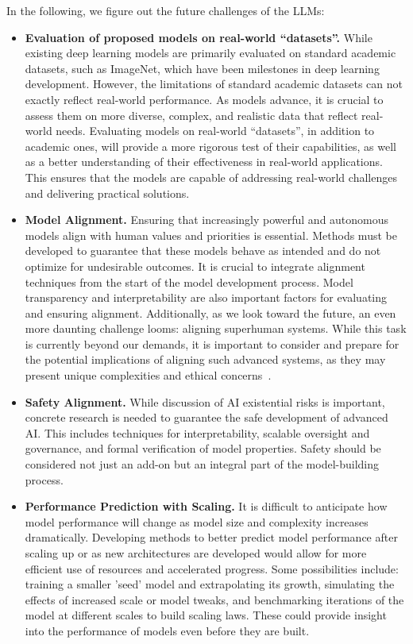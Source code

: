 \documentclass[manuscript,screen, nonacm]{acmart}
\begin{document}
In the following, we figure out the future challenges of the LLMs:
\begin{itemize}[leftmargin=0.4cm]
    \item\textbf{Evaluation of proposed models on real-world ``datasets''.} 
    While existing deep learning models are primarily evaluated on standard academic datasets, such as ImageNet, which have been milestones in deep learning development. However, the limitations of standard academic datasets can not exactly reflect real-world performance. As models advance, it is crucial to assess them on more diverse, complex, and realistic data that reflect real-world needs. Evaluating models on real-world ``datasets'', in addition to academic ones, will provide a more rigorous test of their capabilities, as well as a better understanding of their effectiveness in real-world applications. This ensures that the models are capable of addressing real-world challenges and delivering practical solutions. 
    
    \item \textbf{Model Alignment.} 
    Ensuring that increasingly powerful and autonomous models align with human values and priorities is essential. Methods must be developed to guarantee that these models behave as intended and do not optimize for undesirable outcomes. It is crucial to integrate alignment techniques from the start of the model development process. Model transparency and interpretability are also important factors for evaluating and ensuring alignment. Additionally, as we look toward the future, an even more daunting challenge looms: aligning superhuman systems. While this task is currently beyond our demands, it is important to consider and prepare for the potential implications of aligning such advanced systems, as they may present unique complexities and ethical concerns~\cite{bai2022constitutional, bowman2022measuring}. 
        
    \item\textbf{Safety Alignment.} While discussion of AI existential risks is important, concrete research is needed to guarantee the safe development of advanced AI. This includes techniques for interpretability, scalable oversight and governance, and formal verification of model properties. Safety should be considered not just an add-on but an integral part of the model-building process.
    
    \item\textbf{Performance Prediction with Scaling.} It is difficult to anticipate how model performance will change as model size and complexity increases dramatically. Developing methods to better predict model performance after scaling up or as new architectures are developed would allow for more efficient use of resources and accelerated progress. Some possibilities include: training a smaller 'seed' model and extrapolating its growth, simulating the effects of increased scale or model tweaks, and benchmarking iterations of the model at different scales to build scaling laws. These could provide insight into the performance of models even before they are built.
\end{itemize}











\end{document}
